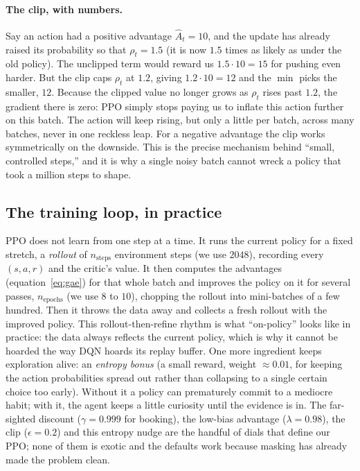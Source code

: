 \documentclass[11pt]{article}
\newcommand{\key}[1]{\textit{#1}}            %
\begin{document}
\paragraph{The clip, with numbers.} Say an action had a positive advantage $\hat A_t = 10$,
and the update has already raised its probability so that $\rho_t = 1.5$ (it is now $1.5$
times as likely as under the old policy). The unclipped term would reward us
$1.5\cdot 10 = 15$ for pushing even harder. But the clip caps $\rho_t$ at $1.2$, giving
$1.2\cdot 10 = 12$ and the $\min$ picks the smaller, $12$. Because the clipped value no
longer grows as $\rho_t$ rises past $1.2$, the gradient there is zero: PPO simply stops
paying us to inflate this action further on this batch. The action will keep rising, but
only a little per batch, across many batches, never in one reckless leap. For a negative
advantage the clip works symmetrically on the downside. This is the precise mechanism
behind ``small, controlled steps,'' and it is why a single noisy batch cannot wreck a
policy that took a million steps to shape.

\subsection{The training loop, in practice}

PPO does not learn from one step at a time. It runs the current policy for a fixed stretch,
a \key{rollout} of $n_{\text{steps}}$ environment steps (we use $2048$), recording every
$(s, a, r)$ and the critic's value. It then computes the advantages
(equation~\eqref{eq:gae}) for that whole batch and improves the policy on it for several
passes, $n_{\text{epochs}}$ (we use $8$ to $10$), chopping the rollout into mini-batches of
a few hundred. Then it throws the data away and collects a fresh rollout with the improved
policy. This rollout-then-refine rhythm is what ``on-policy'' looks like in practice: the
data always reflects the current policy, which is why it cannot be hoarded the way DQN
hoards its replay buffer. One more ingredient keeps exploration alive: an \key{entropy
bonus} (a small reward, weight $\approx 0.01$, for keeping the action probabilities spread
out rather than collapsing to a single certain choice too early). Without it a policy can
prematurely commit to a mediocre habit; with it, the agent keeps a little curiosity until
the evidence is in. The far-sighted discount ($\gamma = 0.999$ for booking), the low-bias
advantage ($\lambda = 0.98$), the clip ($\epsilon = 0.2$) and this entropy nudge are the
handful of dials that define our PPO; none of them is exotic and the defaults work because
masking has already made the problem clean.
\end{document}
